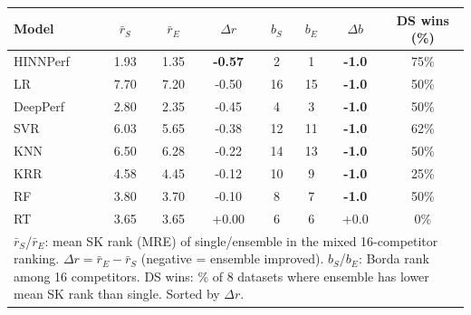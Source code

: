 \begin{tabular}{lccccccc}
\toprule
Model & $\bar{r}_S$ & $\bar{r}_E$ & $\Delta r$ & $b_S$ & $b_E$ & $\Delta b$ & DS wins (\%) \\
\midrule
HINNPerf & 1.93 & 1.35 & \textbf{-0.57} & 2 & 1 & \textbf{-1.0} & 75\% \\
LR & 7.70 & 7.20 & -0.50 & 16 & 15 & \textbf{-1.0} & 50\% \\
DeepPerf & 2.80 & 2.35 & -0.45 & 4 & 3 & \textbf{-1.0} & 50\% \\
SVR & 6.03 & 5.65 & -0.38 & 12 & 11 & \textbf{-1.0} & 62\% \\
KNN & 6.50 & 6.28 & -0.22 & 14 & 13 & \textbf{-1.0} & 50\% \\
KRR & 4.58 & 4.45 & -0.12 & 10 & 9 & \textbf{-1.0} & 25\% \\
RF & 3.80 & 3.70 & -0.10 & 8 & 7 & \textbf{-1.0} & 50\% \\
RT & 3.65 & 3.65 & +0.00 & 6 & 6 & +0.0 & 0\% \\
\bottomrule
\multicolumn{8}{l}{\footnotesize $\bar{r}_S$/$\bar{r}_E$: mean SK rank (MRE) of single/ensemble in the mixed 16-competitor ranking. $\Delta r = \bar{r}_E - \bar{r}_S$ (negative = ensemble improved). $b_S$/$b_E$: Borda rank among 16 competitors. DS wins: \% of 8 datasets where ensemble has lower mean SK rank than single. Sorted by $\Delta r$.} \\
\end{tabular}
